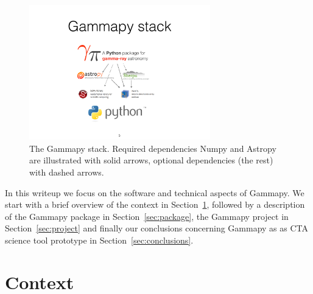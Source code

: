 \documentclass{PoS}
\begin{document}
\begin{figure}[t]
\centering
\includegraphics[width=0.7\textwidth]{figures/gammapy-stack}
\caption{
The Gammapy stack. Required dependencies Numpy and Astropy are illustrated with
solid arrows, optional dependencies (the rest) with dashed arrows.
}
\label{fig:stack} \end{figure}

In this writeup we focus on the software and technical aspects of Gammapy. We
start with a brief overview of the context in Section~\ref{sec:context},
followed by a description of the Gammapy package in Section~\ref{sec:package},
the Gammapy project in Section~\ref{sec:project} and finally our conclusions
concerning Gammapy as as CTA science tool prototype in
Section~\ref{sec:conclusions}.

\section{Context}
\label{sec:context}
\end{document}
